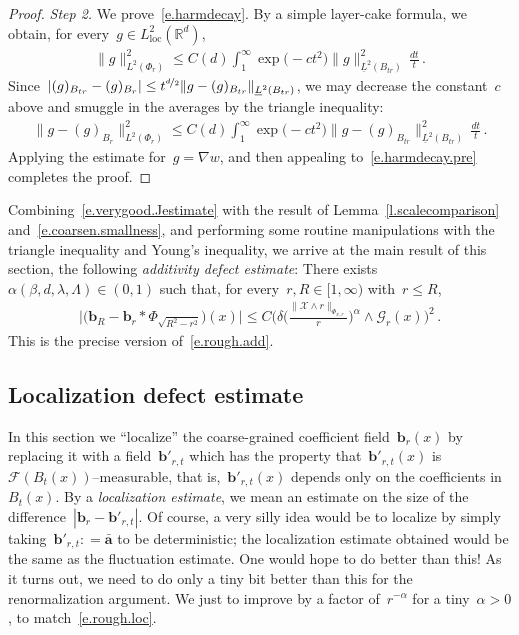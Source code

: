 \documentclass[11pt,twoside]{article} %
\numberwithin{equation}{section}
\theoremstyle{definition}
\newcommand*{\R}{\ensuremath{\mathbb{R}}}
\renewcommand{\b}{\ensuremath{\mathbf{b}}}
\renewcommand{\a}{\mathbf{a}}
\newcommand{\ahom}{\bar{\a}}
\newcommand{\X}{\mathcal{X}}
\begin{document}
\begin{proof}
\emph{Step 2.} We prove~\eqref{e.harmdecay}. By a simple layer-cake formula, we obtain, for every~$g \in L_{\mathrm{loc}}^2(\R^d)$,
\begin{align*}  
\| g \|_{L^2(\Phi_r)}^2 \leq C(d) \int_{1}^\infty \exp\bigl(-c t^2 \bigr) \| g \|_{\underline{L}^2(B_{tr})}^2 \,\frac{dt}{t}  \,.
\end{align*}
Since~$| (g)_{B_{tr}} - (g)_{B_r} | \leq  t^{\nicefrac d2} \| g - (g)_{B_{tr}}  \|_{\underline{L}^2(B_{tr})}$, we may decrease the constant~$c$ above and smuggle in the averages by the triangle inequality:
\begin{align*}  
\| g  -(g)_{B_{r}}  \|_{L^2(\Phi_r)}^2 
\leq 
C(d) \int_{1}^\infty \exp\bigl(-ct^2\bigr) \| g - (g)_{B_{tr}} \|_{\underline{L}^2(B_{tr})}^2 \,\frac{dt}{t}  \,.
\end{align*}
Applying the estimate for~$g = \nabla w$, and then appealing to~\eqref{e.harmdecay.pre} completes the proof.
\end{proof}




Combining~\eqref{e.verygood.Jestimate} with the result of Lemma~\ref{l.scalecomparison} and~\eqref{e.coarsen.smallness}, and performing some routine manipulations with the triangle inequality and Young's inequality, we arrive at the main result of this section, the following \emph{additivity defect estimate}: There exists~$\alpha(\beta,d,\lambda,\Lambda) \in (0,1)$ such that, for every~$r,R \in [1,\infty)$ with~$r \leq R$, 
\begin{align}
\label{e.additivityestimate}
\big|
\bigl( \b_R - \b_r \ast \Phi_{\sqrt{R^2-r^2}} \bigr) (x) 
\big|
\leq
C \biggl( \delta \biggl(\frac{\| \X \wedge r  \|_{\Phi_{x,r}} }{r} \biggr)^{\!\alpha} \wedge \mathcal{G}_r(x) \biggr)^{\!2}
\,.
\end{align}
This is the precise version of~\eqref{e.rough.add}.

\subsection{Localization defect estimate}
\label{ss.local}

In this section we ``localize'' the coarse-grained coefficient field~$\b_r(x)$ by replacing it with a field~$\b'_{r,t}$ which has the property that~$\b'_{r,t}(x)$ is~$\mathcal{F}(B_t(x))$--measurable, that is,~$\b'_{r,t}(x)$ depends only on the coefficients in~$B_t(x)$. By a \emph{localization estimate}, we mean an estimate on the size of the difference~$|\b_r - \b'_{r,t}|$. Of course, a very silly idea would be to localize by simply taking~$\b'_{r,t}: = \ahom$ to be deterministic; the localization estimate obtained would be the same as the fluctuation estimate. One would hope to do better than this! As it turns out, we need to do only a tiny bit better than this for the renormalization argument. We just to improve by a factor of~$r^{-\alpha}$ for a tiny~$\alpha>0$, to match~\eqref{e.rough.loc}. 
\end{document}
